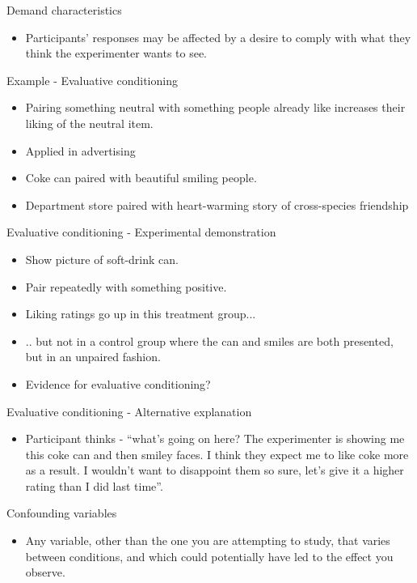 \documentclass{beamer}
\begin{document}
\begin{frame}{Demand characteristics}
\begin{itemize}
\item Participants' responses may be affected by a desire to comply with what they think the experimenter wants to see.
\end{itemize}
\end{frame}

\begin{frame}{Example - Evaluative conditioning}
\begin{itemize}
\item Pairing something neutral with something people already like increases their liking of the neutral item.
\item Applied in advertising
\item Coke can paired with beautiful smiling people.
\item Department store paired with heart-warming story of cross-species friendship 
\end{itemize}
\end{frame}

\begin{frame}{Evaluative conditioning - Experimental demonstration}
\begin{itemize}
\item Show picture of soft-drink can.
\item Pair repeatedly with something positive.
\item Liking ratings go up in this treatment group...
\item .. but not in a control group where the can and smiles are both presented, but in an unpaired fashion. 
\item Evidence for evaluative conditioning?
\end{itemize}
\end{frame}

\begin{frame}{Evaluative conditioning - Alternative explanation}
\begin{itemize}
\item Participant thinks - ``what's going on here? The experimenter is showing me this coke can and then smiley faces. I think they expect me to like coke more as a result. I wouldn't want to disappoint them so sure, let's give it a higher rating than I did last time''.
\end{itemize}
\end{frame}

\begin{frame}{Confounding variables}
	\begin{itemize}
        \item Any variable, other than the one you are attempting to
          study, that varies between conditions, and which could
          potentially have led to the effect you observe.
	\end{itemize}
\end{frame}
\end{document}
